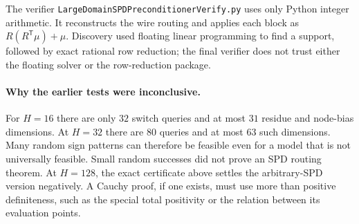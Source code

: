 \documentclass{article}
\begin{document}
The verifier \texttt{LargeDomainSPDPreconditionerVerify.py} uses only Python
integer arithmetic. It reconstructs the wire routing and applies each block
as $R(R^{\mathsf T}\mu)+\mu$. Discovery used floating linear programming to
find a support, followed by exact rational row reduction; the final verifier
does not trust either the floating solver or the row-reduction package.

\paragraph{Why the earlier tests were inconclusive.}
For $H=16$ there are only $32$ switch queries and at most $31$ residue and
node-bias dimensions. At $H=32$ there are $80$ queries and at most $63$ such
dimensions. Many random sign patterns can therefore be feasible even for a
model that is not universally feasible. Small random successes did not prove
an SPD routing theorem. At $H=128$, the exact certificate above settles the
arbitrary-SPD version negatively. A Cauchy proof, if one exists, must use more
than positive definiteness, such as the special total positivity or the
relation between its evaluation points.
\end{document}
